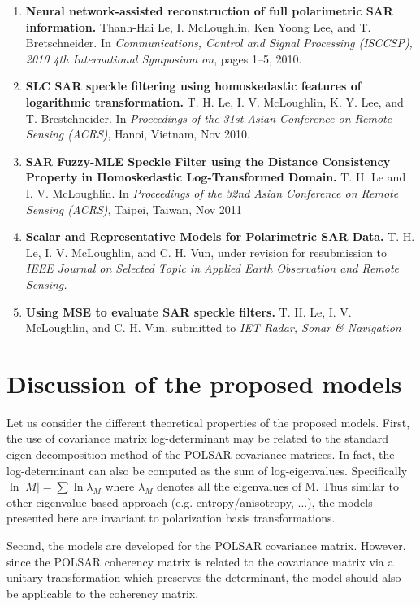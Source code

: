 \begin{enumerate}
\item \textbf{Neural network-assisted reconstruction of full polarimetric SAR information.}
  Thanh-Hai Le, I. McLoughlin, Ken Yoong Lee, and T. Bretschneider.
  In \textit{Communications, Control and Signal Processing (ISCCSP), 2010 4th International Symposium on}, pages 1–5, 2010.  \cite{Le_2010_ISCCSP} 
\item \textbf{SLC SAR speckle filtering using homoskedastic features of logarithmic transformation.}
  T. H. Le, I. V. McLoughlin, K. Y. Lee, and T. Brestchneider.
  In \textit{Proceedings of the 31st Asian Conference on Remote Sensing (ACRS)}, Hanoi, Vietnam, Nov 2010. \cite{Le_2010_ACRS}
\item  \textbf{SAR Fuzzy-MLE Speckle Filter using the Distance Consistency Property in Homoskedastic Log-Transformed Domain.}
  T. H. Le and I. V. McLoughlin. 
  In \textit{Proceedings of the 32nd Asian Conference on Remote Sensing (ACRS)}, Taipei, Taiwan, Nov 2011 \cite{Le_2011_ACRS}
\item \textbf{Scalar and Representative Models for Polarimetric SAR Data.}
  T. H. Le, I. V. McLoughlin, and C. H. Vun,
  under revision for resubmission to \textit{IEEE Journal on Selected Topic in Applied Earth Observation and Remote Sensing.}
  
\item \textbf{Using MSE to evaluate SAR speckle filters.}
  T. H. Le, I. V. McLoughlin, and C. H. Vun.
  submitted to \textit{IET Radar, Sonar \& Navigation}
\end{enumerate}
  
\section{Discussion of the proposed models}

Let us consider the different theoretical properties of the proposed models.
First, the use of covariance matrix log-determinant may be related to the standard eigen-decomposition method of the POLSAR covariance matrices.
In fact, the log-determinant can also be computed as the sum of log-eigenvalues.
Specifically $\ln{|M|} = \sum \ln{\lambda_M}$ where $\lambda_M$ denotes all the eigenvalues of M.
Thus similar to other eigenvalue based approach (e.g. entropy/anisotropy, ...),
  the models presented here are invariant to polarization basis transformations.

Second, the models are developed for the POLSAR covariance matrix.
However, since the POLSAR coherency matrix is related to the covariance matrix via a unitary transformation which preserves the determinant,
  the model should also be applicable to the coherency matrix.


